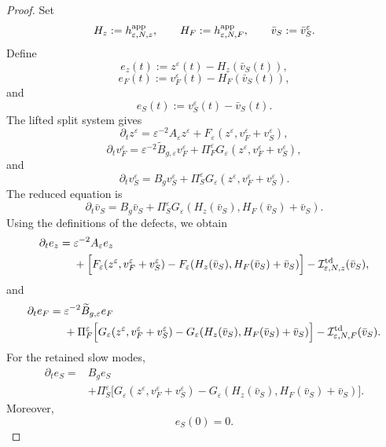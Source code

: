 \documentclass[11pt]{article}
\theoremstyle{definition}
\theoremstyle{remark}
\numberwithin{equation}{section}
\begin{document}
\begin{proof}
Set
\[
H_z:=h_{\varepsilon,N,z}^{\rm app},
\qquad
H_F:=h_{\varepsilon,N,F}^{\rm app},
\qquad
\bar v_S:=\bar v_S^\varepsilon.
\]
Define
\[
e_z(t):=z^\varepsilon(t)-H_z(\bar v_S(t)),
\]
\[
e_F(t):=v_F^\varepsilon(t)-H_F(\bar v_S(t)),
\]
and
\[
e_S(t):=v_S^\varepsilon(t)-\bar v_S(t).
\]
The lifted split system gives
\[
\partial_t z^\varepsilon
=
\varepsilon^{-2}A_\varepsilon z^\varepsilon
+
F_\varepsilon(z^\varepsilon,v_F^\varepsilon+v_S^\varepsilon),
\]
\[
\partial_t v_F^\varepsilon
=
\varepsilon^{-2}\widetilde B_{g,\varepsilon}v_F^\varepsilon
+
\Pi_F^\varepsilon
G_\varepsilon(z^\varepsilon,v_F^\varepsilon+v_S^\varepsilon),
\]
and
\[
\partial_t v_S^\varepsilon
=
B_gv_S^\varepsilon
+
\Pi_S^\varepsilon
G_\varepsilon(z^\varepsilon,v_F^\varepsilon+v_S^\varepsilon).
\]
The reduced equation is
\[
\partial_t\bar v_S
=
B_g\bar v_S
+
\Pi_S^\varepsilon
G_\varepsilon(H_z(\bar v_S),H_F(\bar v_S)+\bar v_S).
\]
Using the definitions of the defects, we obtain
\[
\begin{aligned}
\partial_t e_z
={}&
\varepsilon^{-2}A_\varepsilon e_z
\\
&+
\Big[
F_\varepsilon(z^\varepsilon,v_F^\varepsilon+v_S^\varepsilon)
-
F_\varepsilon(H_z(\bar v_S),H_F(\bar v_S)+\bar v_S)
\Big]
-
\mathcal I_{\varepsilon,N,z}^{\rm td}(\bar v_S),
\end{aligned}
\]
and
\[
\begin{aligned}
\partial_t e_F
={}&
\varepsilon^{-2}\widetilde B_{g,\varepsilon}e_F
\\
&+
\Pi_F^\varepsilon
\Big[
G_\varepsilon(z^\varepsilon,v_F^\varepsilon+v_S^\varepsilon)
-
G_\varepsilon(H_z(\bar v_S),H_F(\bar v_S)+\bar v_S)
\Big]
-
\mathcal I_{\varepsilon,N,F}^{\rm td}(\bar v_S).
\end{aligned}
\]
For the retained slow modes,
\[
\begin{aligned}
\partial_t e_S
={}&
B_ge_S
\\
&+
\Pi_S^\varepsilon
\Big[
G_\varepsilon(z^\varepsilon,v_F^\varepsilon+v_S^\varepsilon)
-
G_\varepsilon(H_z(\bar v_S),H_F(\bar v_S)+\bar v_S)
\Big].
\end{aligned}
\]
Moreover,
\[
e_S(0)=0.
\]


\end{proof}
\end{document}
